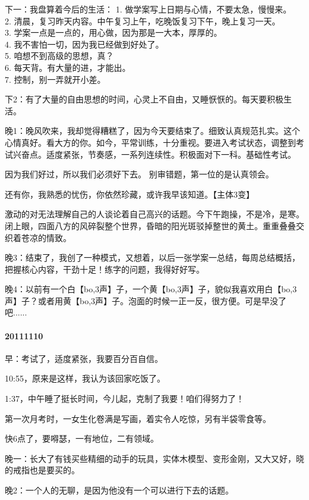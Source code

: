 \documentclass[UTF8]{Diaries}
\begin{document}
下一：我盘算着今后的生活：
1. 做学案写上日期与心情，不要太急，慢慢来。\\
2. 清晨，复习昨天内容。中午复习上午，吃晚饭复习下午，晚上复习一天。\\
3. 学案一点是一点的，用心做，因为那是一大本，厚厚的。\\
4. 我不害怕一切，因为我已经做到好处了。\\
5. 咱想不到高级的思想，真？\\
6. 每天背。有大量的进，才能出。\\
7. 控制，别一弄就开小差。

下2：有了大量的自由思想的时间，心灵上不自由，又睡恹恹的。每天要积极生活。

晚1：晚风吹来，我却觉得糟糕了，因为今天要结束了。细致认真规范扎实。这个心情真好。看大方的你。如今，平常训练，十分重视。要进入考试状态，调整到考试兴奋点。适度紧张，节奏感，一系列连续性。积极面对下一科。基础性考试。

因为我们好过，所以我们必须好下去。
别审错题，第一位的是认真领会。

还有你，我熟悉的忧伤，你依然珍藏，或许我早该知道。【主体3变】

激动的对无法理解自己的人谈论着自己高兴的话题。今下午跑操，不是冷，是寒。闭上眼，四面八方的风碎裂整个世界，昏暗的阳光斑驳掉整世的黄土。重重叠叠交织着苍凉的情致。

晚3：结束了，我创了一种模式，又想着，以后一张学案一总结，每周总结概括，把握核心内容，干劲十足！练字的问题，我得好好写。

晚4：以前有一个白【bo,3声】子，一个黄【bo,3声】子，貌似我喜欢用白【bo,3声】子？或者用黄【bo,3声】子。泡面的时候一正一反，很方便。可是早没了吧......


\paragraph{20111110}

早：考试了，适度紧张，我要百分百自信。

10:55，原来是这样，我认为该回家吃饭了。

1:37，中午睡了挺长时间，今儿起，克制了我要！咱们得努力了！

第一次月考时，一女生化卷满是写画，着实令人吃惊，另有半袋零食等。

快6点了，要嘚瑟，一有地位，二有领域。

晚一：长大了有钱买些精细的动手的玩具，实体木模型、变形金刚，又大又好，晓的戒指也是要买的。

晚2：一个人的无聊，是因为他没有一个可以进行下去的话题。
\end{document}
